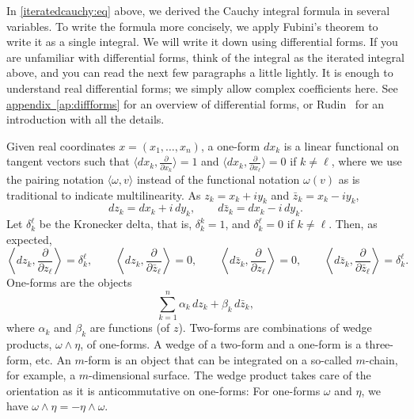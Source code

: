 \documentclass[12pt,openany]{book}
\theoremstyle{plain}
\theoremstyle{remark}
\theoremstyle{definition}
\theoremstyle{exercise}
\theoremstyle{example}
\newcommand{\appendixref}[1]{\hyperref[#1]{appendix~\ref*{#1}}}
\begin{document}
In \eqref{iteratedcauchy:eq} above,
we derived the Cauchy integral formula in several variables.  To
write the formula more concisely, we apply Fubini's theorem to write it as
a single integral.  We will write it down using differential forms.  If you
are unfamiliar with differential forms, think of the integral
as the iterated integral above, and you can read the next few paragraphs
a little lightly.
It is enough to understand real differential forms; we simply allow
complex coefficients here.
See \appendixref{ap:diffforms} for an overview of differential forms,
or
Rudin~\cite{Rudin:principles} for an introduction with all the details.

Given real coordinates $x = (x_1,\ldots,x_n)$, a one-form $d x_k$ is a linear functional on tangent vectors
such that $\bigl\langle d x_k , \frac{\partial}{\partial x_k} \bigr\rangle = 1$ and
$\bigl\langle d x_k , \frac{\partial}{\partial x_{\ell}} \bigr\rangle = 0$ if $k \not=
{\ell}$,
where we use the pairing notation
%
$\langle \omega , v \rangle$ instead of the functional notation
$\omega(v)$ as is traditional to indicate multilinearity.
As $z_k = x_k + i y_k$ and
$\bar{z}_k = x_k - i y_k$,
%
\begin{equation*}
d z_k = d x_k + i \, d y_k ,
\qquad
d \bar{z}_k = d x_k - i \, d y_k .
\end{equation*}
Let
%
$\delta_{k}^{\ell}$ be the Kronecker delta, that is, $\delta_k^k = 1$,
and $\delta_k^{\ell} = 0$ if $k \not= {\ell}$.  Then, as expected,
\begin{equation*}
\left\langle
d z_k , \frac{\partial}{\partial z_{\ell}} \right\rangle =
\delta_k^{\ell} ,
\qquad
\left\langle
d z_k , \frac{\partial}{\partial \bar{z}_{\ell}} \right\rangle = 0 ,
\qquad
\left\langle
d \bar{z}_k , \frac{\partial}{\partial z_{\ell}} \right\rangle = 0 ,
\qquad
\left\langle
d \bar{z}_k , \frac{\partial}{\partial \bar{z}_{\ell}} \right\rangle =
\delta_k^{\ell}
.
\end{equation*}
One-forms are the objects
\begin{equation*}
\sum_{k=1}^n \alpha_k \, d z_k +
\beta_k \, d \bar{z}_k ,
\end{equation*}
where $\alpha_k$ and $\beta_k$ are functions (of $z$).
Two-forms are combinations of wedge products,
$\omega \wedge \eta$, of one-forms.  A wedge of a two-form and
a one-form is a three-form, etc.
An $m$-form is an object that
can be integrated on a so-called $m$-chain, for example, a
$m$-dimensional surface.  The wedge product takes care of the orientation
as it is anticommutative on one-forms:
For one-forms $\omega$ and $\eta$, we have
$\omega \wedge \eta = - \eta \wedge \omega$.
\end{document}
